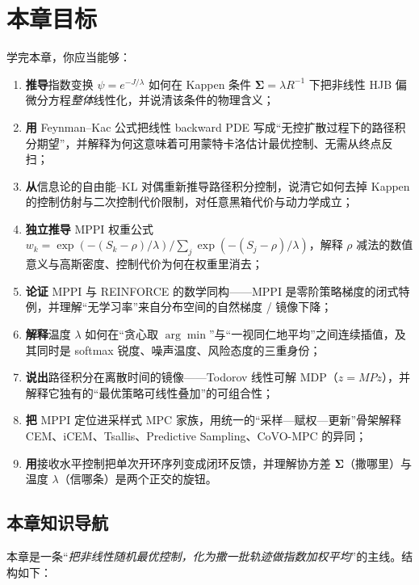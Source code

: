 \section*{本章目标}
学完本章，你应当能够：
\begin{enumerate}
  \item \textbf{推导}指数变换 $\psi=e^{-J/\lambda}$ 如何在 Kappen 条件 $\boldsymbol{\Sigma}=\lambda R^{-1}$ 下把非线性 HJB 偏微分方程\emph{整体}线性化，并说清该条件的物理含义；
  \item \textbf{用} Feynman--Kac 公式把线性 backward PDE 写成“无控扩散过程下的路径积分期望”，并解释为何这意味着可用蒙特卡洛估计最优控制、无需从终点反扫；
  \item \textbf{从}信息论的自由能--KL 对偶重新推导路径积分控制，说清它如何去掉 Kappen 的控制仿射与二次控制代价限制，对任意黑箱代价与动力学成立；
  \item \textbf{独立推导} MPPI 权重公式 $w_k=\exp(-(S_k-\rho)/\lambda)/\sum_j\exp(-(S_j-\rho)/\lambda)$，解释 $\rho$ 减法的数值意义与高斯密度、控制代价为何在权重里消去；
  \item \textbf{论证} MPPI 与 REINFORCE 的数学同构——MPPI 是零阶策略梯度的闭式特例，并理解“无学习率”来自分布空间的自然梯度 / 镜像下降；
  \item \textbf{解释}温度 $\lambda$ 如何在“贪心取 $\arg\min$”与“一视同仁地平均”之间连续插值，及其同时是 softmax 锐度、噪声温度、风险态度的三重身份；
  \item \textbf{说出}路径积分在离散时间的镜像——Todorov 线性可解 MDP（$z=MPz$），并解释它独有的“最优策略可线性叠加”的可组合性；
  \item \textbf{把} MPPI 定位进采样式 MPC 家族，用统一的“采样—赋权—更新”骨架解释 CEM、iCEM、Tsallis、Predictive Sampling、CoVO-MPC 的异同；
  \item \textbf{用}接收水平控制把单次开环序列变成闭环反馈，并理解协方差 $\boldsymbol{\Sigma}$（撒哪里）与温度 $\lambda$（信哪条）是两个正交的旋钮。
\end{enumerate}

\subsection*{本章知识导航}
本章是一条“\emph{把非线性随机最优控制，化为撒一批轨迹做指数加权平均}”的主线。结构如下：

